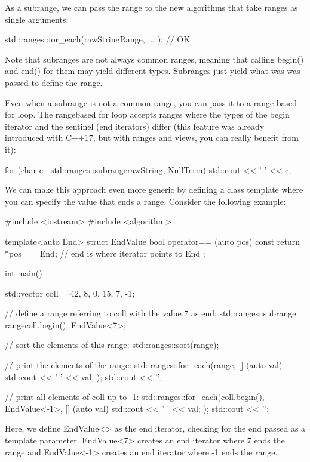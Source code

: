 As a subrange, we can pass the range to the new algorithms that take ranges as single arguments:

\begin{cpp}
std::ranges::for_each(rawStringRange, ... ); // OK
\end{cpp}

Note that subranges are not always common ranges, meaning that calling begin() and end() for them may yield different types. Subranges just yield what was was passed to define the range.

Even when a subrange is not a common range, you can pass it to a range-based for loop. The rangebased for loop accepts ranges where the types of the begin iterator and the sentinel (end iterators) differ (this feature was already introduced with C++17, but with ranges and views, you can really benefit from it):

\begin{cpp}
for (char c : std::ranges::subrange{rawString, NullTerm{}}) {
	std::cout << ' ' << c;
}
\end{cpp}

We can make this approach even more generic by defining a class template where you can specify the value that ends a range. Consider the following example:


\begin{cpp}
#include <iostream>
#include <algorithm>

template<auto End>
struct EndValue {
	bool operator== (auto pos) const {
		return *pos == End; // end is where iterator points to End
	}
};

int main()
{
	std::vector coll = {42, 8, 0, 15, 7, -1};
	
	// define a range referring to coll with the value 7 as end:
	std::ranges::subrange range{coll.begin(), EndValue<7>{}};
	
	// sort the elements of this range:
	std::ranges::sort(range);
	
	// print the elements of the range:
	std::ranges::for_each(range,
						[] (auto val) {
							std::cout << ' ' << val;
						});
	std::cout << '\n';
	
	// print all elements of coll up to -1:
	std::ranges::for_each(coll.begin(), EndValue<-1>{},
							[] (auto val) {
								std::cout << ' ' << val;
							});
	std::cout << '\n';
}
\end{cpp}

Here, we define EndValue<> as the end iterator, checking for the end passed as a template parameter. EndValue<7>{} creates an end iterator where 7 ends the range and EndValue<-1>{} creates an end iterator where -1 ends the range.


